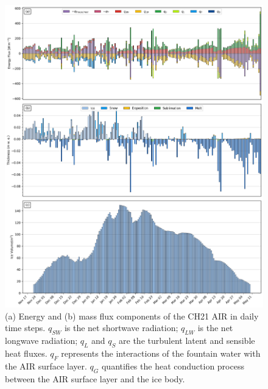 \documentclass[utf8]{frontiersSCNS} %
\begin{document}
\begin{figure} \begin{center} \includegraphics[width=\linewidth]{Figures/Model_Output.jpg} \end{center}
\caption{(a) Energy and (b) mass flux components of the CH21 AIR in daily time steps.  $q_{SW}$ is the
    net shortwave radiation; $q_{LW}$ is the net longwave radiation; $q_{L}$ and $q_{S}$ are the turbulent latent and
    sensible heat fluxes. $q_{F}$ represents the interactions of the fountain water with the AIR surface layer.  $q_{G}$
    quantifies the heat conduction process between the AIR surface layer and the ice body. } \label{fig:EB} \end{figure}
\end{document}
